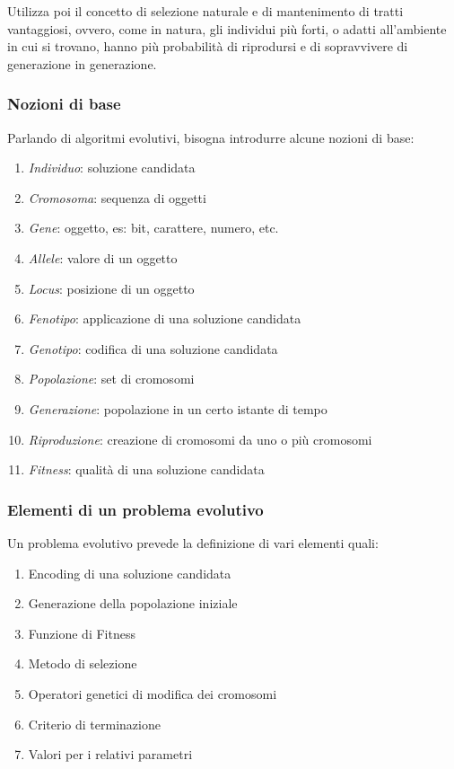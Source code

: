 \documentclass[a4paper]{article}
\begin{document}
Utilizza poi il concetto di selezione naturale e di mantenimento di tratti 
vantaggiosi, ovvero, come in natura, gli individui più forti, o adatti all'ambiente 
in cui si trovano, hanno più probabilità di riprodursi e di sopravvivere di generazione 
in generazione.

\subsubsection{Nozioni di base}
Parlando di algoritmi evolutivi, bisogna introdurre alcune nozioni di base:
\begin{enumerate}
    \item \emph{Individuo}: soluzione candidata
    \item \emph{Cromosoma}: sequenza di oggetti
    \item \emph{Gene}: oggetto, es: bit, carattere, numero, etc.
    \item \emph{Allele}: valore di un oggetto
    \item \emph{Locus}: posizione di un oggetto
    \item \emph{Fenotipo}: applicazione di una soluzione candidata
    \item \emph{Genotipo}: codifica di una soluzione candidata
    \item \emph{Popolazione}: set di cromosomi
    \item \emph{Generazione}: popolazione in un certo istante di tempo
    \item \emph{Riproduzione}: creazione di cromosomi da uno o più cromosomi
    \item \emph{Fitness}: qualità di una soluzione candidata
\end{enumerate}

\subsubsection{Elementi di un problema evolutivo}
Un problema evolutivo prevede la definizione di vari elementi quali:
\begin{enumerate}
    \item Encoding di una soluzione candidata
    \item Generazione della popolazione iniziale
    \item Funzione di Fitness
    \item Metodo di selezione
    \item Operatori genetici di modifica dei cromosomi
    \item Criterio di terminazione
    \item Valori per i relativi parametri
\end{enumerate}
\end{document}
